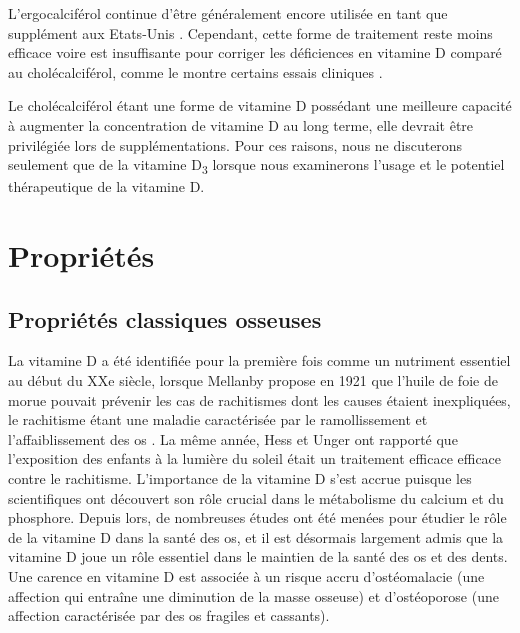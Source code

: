 \documentclass[
  a4paper,
  DIV=11,
  numbers=noendperiod,
  listof=totoc]{scrreprt}
\begin{document}
L'ergocalciférol continue d'être généralement encore utilisée en tant
que supplément aux Etats-Unis \autocite{Houghton.2006}. Cependant, cette
forme de traitement reste moins efficace voire est insuffisante pour
corriger les déficiences en vitamine D comparé au cholécalciférol, comme
le montre certains essais cliniques \autocite{Boyle.2005}.

Le cholécalciférol étant une forme de vitamine D possédant une meilleure
capacité à augmenter la concentration de vitamine D au long terme, elle
devrait être privilégiée lors de supplémentations. Pour ces raisons,
nous ne discuterons seulement que de la vitamine D\textsubscript{3}
lorsque nous examinerons l'usage et le potentiel thérapeutique de la
vitamine D.

\hypertarget{propriuxe9tuxe9s}{%
\section{Propriétés}\label{propriuxe9tuxe9s}}

\hypertarget{propriuxe9tuxe9s-classiques-osseuses}{%
\subsection{Propriétés classiques
osseuses}\label{propriuxe9tuxe9s-classiques-osseuses}}

La vitamine D a été identifiée pour la première fois comme un nutriment
essentiel au début du XXe siècle, lorsque Mellanby propose en 1921 que
l'huile de foie de morue pouvait prévenir les cas de rachitismes dont
les causes étaient inexpliquées, le rachitisme étant une maladie
caractérisée par le ramollissement et l'affaiblissement des os
\autocite{Mavrotas.2021}. La même année, Hess et Unger ont rapporté que
l'exposition des enfants à la lumière du soleil était un traitement
efficace efficace contre le rachitisme. \autocite{Holick.2015}
L'importance de la vitamine D s'est accrue puisque les scientifiques ont
découvert son rôle crucial dans le métabolisme du calcium et du
phosphore. Depuis lors, de nombreuses études ont été menées pour étudier
le rôle de la vitamine D dans la santé des os, et il est désormais
largement admis que la vitamine D joue un rôle essentiel dans le
maintien de la santé des os et des dents. Une carence en vitamine D est
associée à un risque accru d'ostéomalacie (une affection qui entraîne
une diminution de la masse osseuse) et d'ostéoporose (une affection
caractérisée par des os fragiles et cassants).
\end{document}
